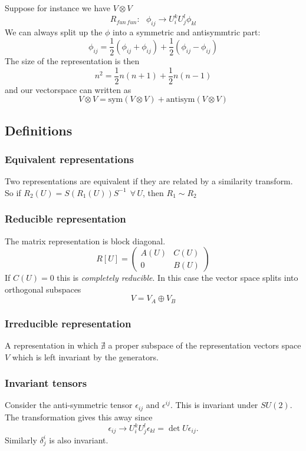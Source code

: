 \documentclass[a4paper,12pt]{article}
\begin{document}
Suppose for instance we have $V\otimes V$
\begin{equation}
R_{fun\,fun}:~~~\phi_{ij}\to U_i^kU_j^l \phi_{kl}
\end{equation}
We can always split up the $\phi$ into a symmetric and antisymmtric part:
\begin{equation} \label{eq:vecspace}
\phi_{ij}=\frac{1}{2}(\phi_{ij}+\phi_{ij})+\frac{1}{2}(\phi_{ij}-\phi_{ij})
\end{equation}
The size of the representation is then
\begin{equation}
n^2 = \frac{1}{2}n(n+1)+\frac{1}{2}n(n-1)
\end{equation}
and our vectorspace can written as
\begin{equation}
V\otimes V=\text{sym}(V\otimes V)+\text{antisym}(V\otimes V)
\end{equation}
\subsection{Definitions}
\subsubsection{Equivalent representations}
Two representations are equivalent if they are related by a similarity transform. So if $R_2(U)=S(R_1(U))S^{-1}~~\forall\,U$, then $R_1\sim R_2 $
\subsubsection{Reducible representation}
The matrix representation is block diagonal.
\begin{equation}
R[U]=\begin{pmatrix}
A(U) & C(U)\\ 0 & B(U)
\end{pmatrix}
\end{equation}
If $C(U)=0$ this is \textit{completely reducible}. In this case the vector space splits into orthogonal subspaces
\begin{equation}
V=V_A \oplus V_B
\end{equation}
\subsubsection{Irreducible representation}
A representation in which $\nexists$ a proper subspace of the representation vectors space $V$ which is left invariant by the generators.
\subsubsection{Invariant tensors}
Consider the anti-symmetric tensor $\epsilon_{ij}$ and $\epsilon^{ij}$. This is invariant under $SU(2)$. The transformation gives this away since
\begin{equation}
\epsilon_{ij}\to U_i^k U_j^l\epsilon_{kl}= \det U \epsilon_{ij}.
\end{equation}
Similarly $\delta^i_j$ is also invariant.
\end{document}
